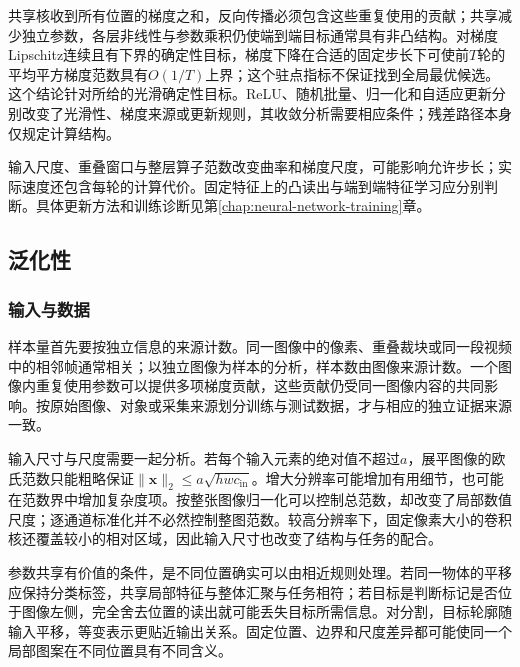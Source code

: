 共享核收到所有位置的梯度之和，反向传播必须包含这些重复使用的贡献；共享减少独立参数，各层非线性与参数乘积仍使端到端目标通常具有非凸结构。对梯度Lipschitz连续且有下界的确定性目标，梯度下降在合适的固定步长下可使前$T$轮的平均平方梯度范数具有$O(1/T)$上界；这个驻点指标不保证找到全局最优候选。这个结论针对所给的光滑确定性目标。ReLU、随机批量、归一化和自适应更新分别改变了光滑性、梯度来源或更新规则，其收敛分析需要相应条件；残差路径本身仅规定计算结构。

输入尺度、重叠窗口与整层算子范数改变曲率和梯度尺度，可能影响允许步长；实际速度还包含每轮的计算代价。固定特征上的凸读出与端到端特征学习应分别判断。具体更新方法和训练诊断见第\ref{chap:neural-network-training}章。

\subsection{泛化性}
\label{sec:cnn-generalization}

\subsubsection{输入与数据}
\label{sec:cnn-data-generalization}

样本量首先要按独立信息的来源计数。同一图像中的像素、重叠裁块或同一段视频中的相邻帧通常相关；以独立图像为样本的分析，样本数由图像来源计数。一个图像内重复使用参数可以提供多项梯度贡献，这些贡献仍受同一图像内容的共同影响。按原始图像、对象或采集来源划分训练与测试数据，才与相应的独立证据来源一致。

输入尺寸与尺度需要一起分析。若每个输入元素的绝对值不超过$a$，展平图像的欧氏范数只能粗略保证$\lVert\bm x\rVert_2\leq a\sqrt{hwc_{\mathrm{in}}}$。增大分辨率可能增加有用细节，也可能在范数界中增加复杂度项。按整张图像归一化可以控制总范数，却改变了局部数值尺度；逐通道标准化并不必然控制整图范数。较高分辨率下，固定像素大小的卷积核还覆盖较小的相对区域，因此输入尺寸也改变了结构与任务的配合。

参数共享有价值的条件，是不同位置确实可以由相近规则处理。若同一物体的平移应保持分类标签，共享局部特征与整体汇聚与任务相符；若目标是判断标记是否位于图像左侧，完全舍去位置的读出就可能丢失目标所需信息。对分割，目标轮廓随输入平移，等变表示更贴近输出关系。固定位置、边界和尺度差异都可能使同一个局部图案在不同位置具有不同含义。

